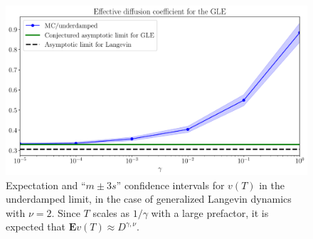 \documentclass[11pt,a4paper]{article}
\newcommand{\expect}[0]{\mathbf{E}}
\theoremstyle{plain}
\numberwithin{equation}{section}
\begin{document}
\begin{figure}[ht]
    \centering
    \includegraphics[width=0.75\linewidth]{figures/mobility_gle.pdf}
    \caption{%
        Expectation and ``$m \pm 3 s$'' confidence intervals for $v(T)$ in the underdamped limit,
        in the case of generalized Langevin dynamics with $\nu = 2$.
        Since $T$ scales as $1/\gamma$ with a large prefactor,
        it is expected that $\expect v(T) \approx D^{\gamma,\nu}$.
    }
    \label{fig:effective_diffusion_gle}
\end{figure}


\end{document}
